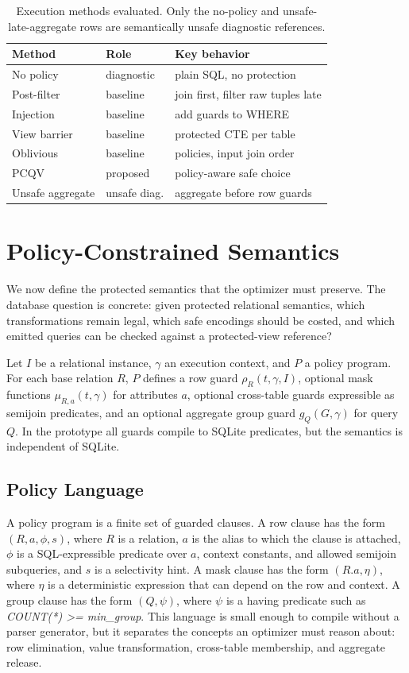 \documentclass[conference]{IEEEtran}
\newcommand{\pcqv}{PCQV}
\newcommand{\ctx}{\gamma}
\begin{document}
\begin{table}[t]
\centering
\caption{Execution methods evaluated. Only the no-policy and unsafe-late-aggregate rows are semantically unsafe diagnostic references.}
\label{tab:baselines}
\begin{tabular}{lll}
\toprule
Method & Role & Key behavior \\
\midrule
No policy & diagnostic & plain SQL, no protection \\
Post-filter & baseline & join first, filter raw tuples late \\
Injection & baseline & add guards to WHERE \\
View barrier & baseline & protected CTE per table \\
Oblivious & baseline & policies, input join order \\
\pcqv{} & proposed & policy-aware safe choice \\
Unsafe aggregate & unsafe diag. & aggregate before row guards \\
\bottomrule
\end{tabular}
\end{table}


\section{Policy-Constrained Semantics}
\label{sec:semantics}

We now define the protected semantics that the optimizer must preserve. The database question is concrete: given protected relational semantics, which transformations remain legal, which safe encodings should be costed, and which emitted queries can be checked against a protected-view reference?

Let $I$ be a relational instance, $\ctx$ an execution context, and $P$ a policy program. For each base relation $R$, $P$ defines a row guard $\rho_R(t,\ctx,I)$, optional mask functions $\mu_{R,a}(t,\ctx)$ for attributes $a$, optional cross-table guards expressible as semijoin predicates, and an optional aggregate group guard $g_Q(G,\ctx)$ for query $Q$. In the prototype all guards compile to SQLite predicates, but the semantics is independent of SQLite.

\subsection{Policy Language}
A policy program is a finite set of guarded clauses. A row clause has the form $(R,a,\phi,s)$, where $R$ is a relation, $a$ is the alias to which the clause is attached, $\phi$ is a SQL-expressible predicate over $a$, context constants, and allowed semijoin subqueries, and $s$ is a selectivity hint. A mask clause has the form $(R.a,\eta)$, where $\eta$ is a deterministic expression that can depend on the row and context. A group clause has the form $(Q,\psi)$, where $\psi$ is a having predicate such as \textit{COUNT(*) >= min\_group}. This language is small enough to compile without a parser generator, but it separates the concepts an optimizer must reason about: row elimination, value transformation, cross-table membership, and aggregate release.
\end{document}
